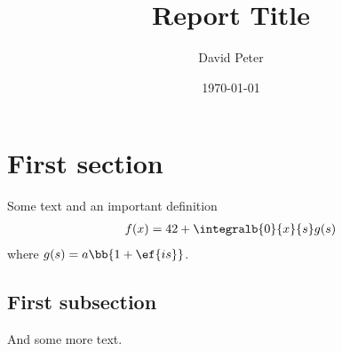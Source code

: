 \title{Report Title}
\author{David Peter}
\date{\today}




\section{First section}
Some text and an important definition
\begin{align}
    f(x) = 42 + \integralb{0}{x}{s} g(s)
\end{align}
where $g(s)=a \bb{1 + \ef{i s}}$.

\subsection{First subsection}
And some more text.




